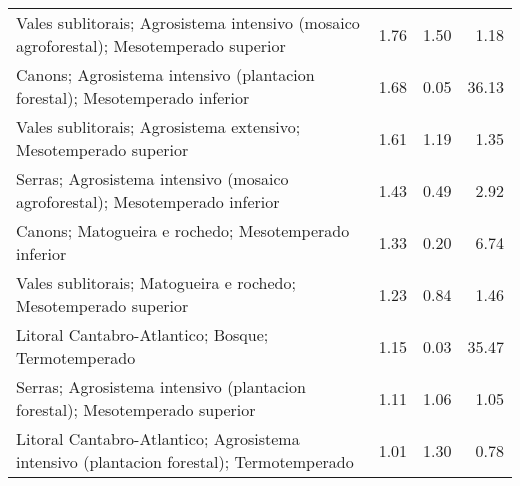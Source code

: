 \begin{table}[p]
\begin{tabular}{lrrr}
  Vales sublitorais; Agrosistema intensivo (mosaico agroforestal); Mesotemperado superior & 1.76 & 1.50 & 1.18 \\ 
  Canons; Agrosistema intensivo (plantacion forestal); Mesotemperado inferior & 1.68 & 0.05 & 36.13 \\ 
  Vales sublitorais; Agrosistema extensivo; Mesotemperado superior & 1.61 & 1.19 & 1.35 \\ 
  Serras; Agrosistema intensivo (mosaico agroforestal); Mesotemperado inferior & 1.43 & 0.49 & 2.92 \\ 
  Canons; Matogueira e rochedo; Mesotemperado inferior & 1.33 & 0.20 & 6.74 \\ 
  Vales sublitorais; Matogueira e rochedo; Mesotemperado superior & 1.23 & 0.84 & 1.46 \\ 
  Litoral Cantabro-Atlantico; Bosque; Termotemperado & 1.15 & 0.03 & 35.47 \\ 
  Serras; Agrosistema intensivo (plantacion forestal); Mesotemperado superior & 1.11 & 1.06 & 1.05 \\ 
  Litoral Cantabro-Atlantico; Agrosistema intensivo (plantacion forestal); Termotemperado & 1.01 & 1.30 & 0.78 \\ 
   \hline
\end{tabular}
\end{table}
